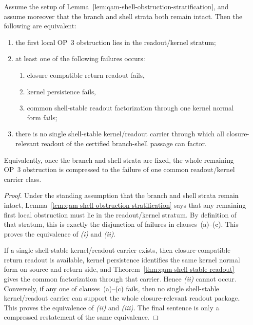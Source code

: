 \begin{lemma}\label{lem:qam-readout-kernel-obstruction-compression}
Assume the setup of Lemma~\ref{lem:qam-shell-obstruction-stratification}, and assume moreover that the branch and shell strata both remain intact. Then the following are equivalent:
\begin{enumerate}[leftmargin=2em,label=(\roman*)]
 \item the first local OP~3 obstruction lies in the readout/kernel stratum;
 \item at least one of the following failures occurs:
 \begin{enumerate}[leftmargin=2em,label=(\alph*)]
 \item closure-compatible return readout fails,
 \item kernel persistence fails,
 \item common shell-stable readout factorization through one kernel normal form fails;
 \end{enumerate}
 \item there is no single shell-stable kernel/readout carrier through which all closure-relevant readout of the certified branch-shell passage can factor.
\end{enumerate}
Equivalently, once the branch and shell strata are fixed, the whole remaining OP~3 obstruction is compressed to the failure of one common readout/kernel carrier class.
\end{lemma}

\begin{proof}
Under the standing assumption that the branch and shell strata remain intact, Lemma~\ref{lem:qam-shell-obstruction-stratification} says that any remaining first local obstruction must lie in the readout/kernel stratum. By definition of that stratum, this is exactly the disjunction of failures in clauses~(a)--(c). This proves the equivalence of \emph{(i)} and \emph{(ii)}.

If a single shell-stable kernel/readout carrier exists, then closure-compatible return readout is available, kernel persistence identifies the same kernel normal form on source and return side, and Theorem~\ref{thm:qam-shell-stable-readout} gives the common factorization through that carrier. Hence \emph{(ii)} cannot occur. Conversely, if any one of clauses~(a)--(c) fails, then no single shell-stable kernel/readout carrier can support the whole closure-relevant readout package. This proves the equivalence of \emph{(ii)} and \emph{(iii)}. The final sentence is only a compressed restatement of the same equivalence.
\end{proof}

